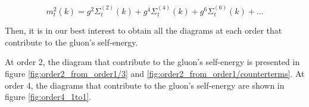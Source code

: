 \documentclass[11pt,a4paper,twoside,pdf]{article}
\numberwithin{equation}{section}
\begin{document}
\begin{equation}
    m_{t}^2 (k) = g^2 \Sigma_t^{(2)} (k) + g^4 \Sigma_t^{(4)} (k) + g^6 \Sigma_t^{(6)} (k) + \ldots
\end{equation} 

Then, it is in our best interest to obtain all the diagrams at each order that contribute
to the gluon's self-energy.

At order 2, the diagram that contribute to the gluon's self-energy is presented in figure 
\ref{fig:order2_from_order1/3}  and \ref{fig:order2_from_order1/counterterms}.
At order 4, the diagrams that contribute to the gluon's self-energy are shown in figure
\ref{fig:order4_1to1}.
\end{document}
